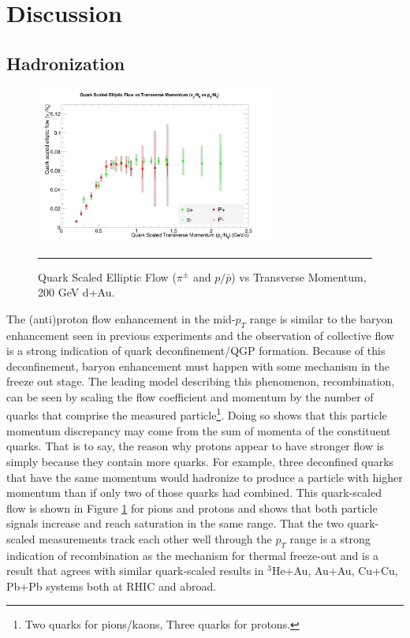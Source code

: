 \section{Discussion}

\subsection{Hadronization}
\begin{figure}[hbtp]
\centering    
    \includegraphics[width=0.7\textwidth]{results/v2NqvspT.jpg}
    \rule{35em}{0.5pt}
    \caption[Quark Scaled Elliptic Flow ($\pi^{\pm}$ and $p/\bar{p}$) vs Transverse Momentum, 200 GeV d+Au.]{Quark Scaled Elliptic Flow ($\pi^{\pm}$ and $p/\bar{p}$) vs Transverse Momentum, 200 GeV d+Au.}
    \label{fig:qscaledv2}
\end{figure}

The (anti)proton flow enhancement in the mid-$p_T$ range is similar to the baryon enhancement seen in previous experiments and the observation of collective flow is a strong indication of quark deconfinement/QGP formation. Because of this deconfinement, baryon enhancement must happen with some mechanism in the freeze out stage. The leading model describing this phenomenon, recombination, can be seen by scaling the flow coefficient and momentum by the number of quarks that comprise the measured particle\footnote{Two quarks for pions/kaons, Three quarks for protons.}. Doing so shows that this particle momentum discrepancy may come from the sum of momenta of the constituent quarks. That is to say, the reason why protons appear to have stronger flow is simply because they contain more quarks. For example, three deconfined quarks that have the same momentum would hadronize to produce a particle with higher momentum than if only two of those quarks had combined. This quark-scaled flow is shown in Figure \ref{fig:qscaledv2} for pions and protons and shows that both particle signals increase and reach saturation in the same range. That the two quark-scaled measurements track each other well through the $p_T$ range is a strong indication of recombination as the mechanism for thermal freeze-out and is a result that agrees with similar quark-scaled results in $^3$He+Au\citep{huangQM2015}, Au+Au\citep{Adler:2003kt}, Cu+Cu\citep{PhysRevC.92.034913}, Pb+Pb\citep{Noferini:2012ps} systems both at RHIC and abroad.

